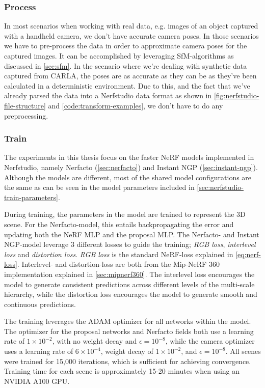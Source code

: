 \subsubsection{Process}

In most scenarios when working with real data, e.g. images of an object captured with a handheld camera, we don't have accurate camera poses. In those scenarios we have to pre-process the data in order to approximate camera poses for the captured images. It can be accomplished by leveraging SfM-algorithms as discussed in \autoref{sec:sfm}. In the scenario where we're dealing with synthetic data captured from CARLA, the poses are as accurate as they can be as they've been calculated in a deterministic environment. Due to this, and the fact that we've already parsed the data into a Nerfstudio data format as shown in \autoref{fig:nerfstudio-file-structure} and \autoref{code:transform-examples}, we don't have to do any preprocessing.

\subsubsection{Train}

The experiments in this thesis focus on the faster NeRF models implemented in Nerfstudio, namely Nerfacto (\autoref{sec:nerfacto}) and Instant NGP (\autoref{sec:instant-ngp}). Although the models are different, most of the shared model configurations are the same as can be seen in the model parameters included in \autoref{sec:nerfstudio-train-parameters}.

During training, the parameters in the model are trained to represent the 3D scene. For the Nerfacto-model, this entails backpropagating the error and updating both the NeRF MLP and the proposal MLP. The Nerfacto- and Instant NGP-model leverage 3 different losses to guide the training; \textit{RGB loss}, \textit{interlevel loss} and \textit{distortion loss}. \textit{RGB loss} is the standard NeRF-loss explained in \autoref{eq:nerf-loss}. Interlevel- and distortion-loss are both from the Mip-NeRF 360 implementation explained in \autoref{sec:mipnerf360}. The interlevel loss encourages the model to generate consistent predictions across different levels of the multi-scale hierarchy, while the distortion loss encourages the model to generate smooth and continuous predictions.

The training leverages the ADAM optimizer for all networks within the model. The optimizer for the proposal networks and Nerfacto fields both use a learning rate of $1 \times 10^{-2}$, with no weight decay and $\epsilon=10^{-8}$, while the camera optimizer uses a learning rate of $6 \times 10^{-4}$, weight decay of $1 \times 10^{-2}$, and $\epsilon=10^{-8}$. All scenes were trained for 15,000 iterations, which is sufficient for achieving convergence. Training time for each scene is approximately 15-20 minutes when using an NVIDIA A100 GPU.

